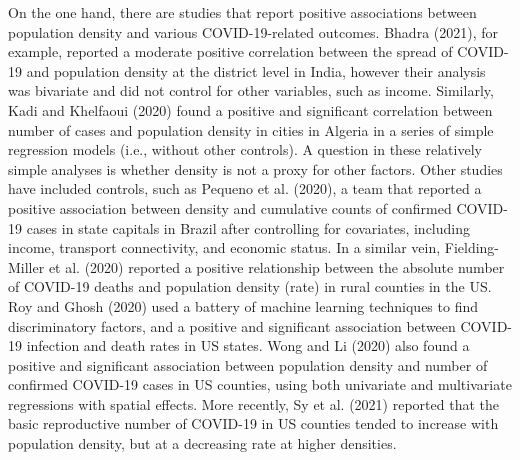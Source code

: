 \documentclass[]{elsarticle} %
\begin{document}
On the one hand, there are studies that report positive associations
between population density and various COVID-19-related outcomes. Bhadra
(2021), for example, reported a moderate positive correlation between
the spread of COVID-19 and population density at the district level in
India, however their analysis was bivariate and did not control for
other variables, such as income. Similarly, Kadi and Khelfaoui (2020)
found a positive and significant correlation between number of cases and
population density in cities in Algeria in a series of simple regression
models (i.e., without other controls). A question in these relatively
simple analyses is whether density is not a proxy for other factors.
Other studies have included controls, such as Pequeno et al. (2020), a
team that reported a positive association between density and cumulative
counts of confirmed COVID-19 cases in state capitals in Brazil after
controlling for covariates, including income, transport connectivity,
and economic status. In a similar vein, Fielding-Miller et al. (2020)
reported a positive relationship between the absolute number of COVID-19
deaths and population density (rate) in rural counties in the US. Roy
and Ghosh (2020) used a battery of machine learning techniques to find
discriminatory factors, and a positive and significant association
between COVID-19 infection and death rates in US states. Wong and Li
(2020) also found a positive and significant association between
population density and number of confirmed COVID-19 cases in US
counties, using both univariate and multivariate regressions with
spatial effects. More recently, Sy et al. (2021) reported that the basic
reproductive number of COVID-19 in US counties tended to increase with
population density, but at a decreasing rate at higher densities.
\end{document}
